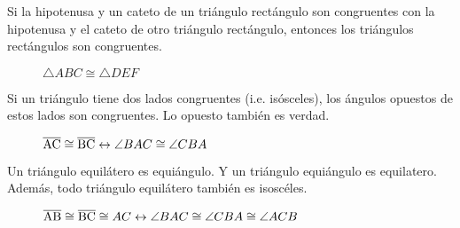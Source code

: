 \clearpage

\begin{postulate}
    Si la hipotenusa y un cateto de un triángulo rectángulo son congruentes con la hipotenusa y el cateto de otro triángulo rectángulo, entonces los triángulos rectángulos son congruentes.

    \begin{figure}[h!]

        \centering

        \begin{subfigure}[b]{.5\textwidth}
            \centering
            
            \label{fig:triang-cong-hc-1}
        \end{subfigure}%
        \begin{subfigure}[b]{.5\textwidth}
            \centering
            
            \label{fig:triang-cong-hc-2}
        \end{subfigure}

        \centering
        \caption{$\triangle{ABC} \cong \triangle{DEF}$}
        \label{fig:triang-cong-hc}
        
    \end{figure}    
        
\end{postulate}

\begin{theorem}
    Si un triángulo tiene dos lados congruentes (i.e. isósceles), los ángulos opuestos de estos lados son congruentes. Lo opuesto también es verdad.

        \begin{figure}[!h]
            \centering
            
            \label{fig:triang-cong-isosceles}
            \caption{$\overline{\rm AC} \cong \overline{\rm BC} \leftrightarrow \angle{BAC} \cong \angle{CBA}$}            
        \end{figure}
\end{theorem}

\begin{theorem}
    Un triángulo equilátero es equiángulo. Y un triángulo equiángulo es equilatero. Además, todo triángulo equilátero también es isoscéles.

    \begin{figure}[!h]
        \centering
        
        \label{fig:traing-cong-equilatero}
        \caption{$\overline{\rm AB} \cong \overline{\rm BC}  \cong {AC} \leftrightarrow \angle{BAC} \cong \angle{CBA} \cong \angle{ACB}$}            
    \end{figure}
    
\end{theorem}

